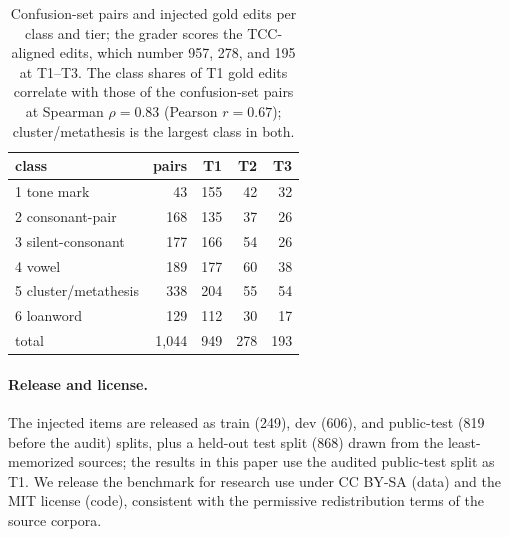 \documentclass[11pt]{article}
\begin{document}
\begin{table}[t]
\centering\small\setlength{\tabcolsep}{4pt}
\begin{tabular}{@{}lrrrr@{}}
\toprule
class & pairs & T1 & T2 & T3 \\
\midrule
1 tone mark          & 43    & 155 & 42  & 32  \\
2 consonant-pair     & 168   & 135 & 37  & 26  \\
3 silent-consonant   & 177   & 166 & 54  & 26  \\
4 vowel              & 189   & 177 & 60  & 38  \\
5 cluster/metathesis & 338   & 204 & 55  & 54  \\
6 loanword           & 129   & 112 & 30  & 17  \\
\midrule
total                & 1{,}044 & 949 & 278 & 193 \\
\bottomrule
\end{tabular}
\caption{Confusion-set pairs and injected gold edits per class and tier; the grader scores the TCC-aligned edits, which number 957, 278, and 195 at T1--T3. The class shares of T1 gold
edits correlate with those of the confusion-set pairs at Spearman $\rho = 0.83$ (Pearson
$r = 0.67$); cluster/metathesis is the largest class in both.}
\label{tab:classcounts}
\end{table}

\paragraph{Release and license.} The injected items are released as train (249), dev (606), and
public-test (819 before the audit) splits, plus a held-out test split (868) drawn from the
least-memorized sources; the results in this paper use the audited public-test split as T1. We release the benchmark for research use under CC BY-SA (data) and the MIT
license (code), consistent with the permissive redistribution terms of the source corpora.
\end{document}

